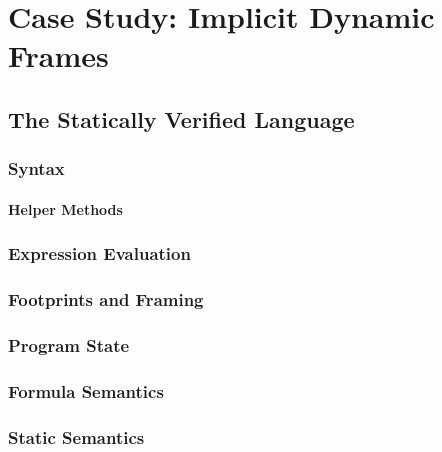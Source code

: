 \chapter{Case Study: Implicit Dynamic Frames}
\label{ch:case-study--implicit}


\section{The Statically Verified Language \svlidf}
\label{sec:language}


    \subsection{Syntax}
    \label{sec:syntax}
    
    
    \subsubsection{Helper Methods}
    
    
    \subsection{Expression Evaluation}
    \label{sec:expeval}
    
    
    \subsection{Footprints and Framing}
    \label{ssec:framing}
    
    
    \subsection{Program State}
    \label{ssec:program-state}
    
        
    \subsection{Formula Semantics}
    \label{ssec:formula-semantics}
    
    
    \subsection{Static Semantics}
    \label{sec:static-semantics}
    
    
